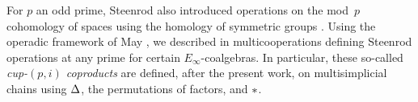 %

For $p$ an odd prime, Steenrod also introduced operations on the mod~$p$ cohomology of spaces using the homology of symmetric groups \cite{steenrod1952reduced, steenrod1953cyclic}.
Using the operadic framework of May \cite{may1970general}, we described in \cite{medina2021may_st}
multicooperations defining Steenrod operations at any prime for certain $E_\infty$-coalgebras.
In particular, these so-called \textit{cup-$(p,i)$ coproducts} are defined, after the present work, on multisimplicial chains using $\operatorname{\Delta}$, the permutations of factors, and $\operatorname{\ast}$.

